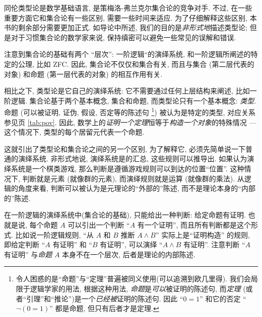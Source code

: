 \label{sec:axioms}

同伦类型论是数学基础语言, 是策梅洛-弗兰克尔集合论的竞争对手.
不过, 在一些重要方面它和集合论有一些区别, 需要一些时间来适应.
为了仔细解释这些区别, 本书的剩余部分需要更加正式.
如导论中所述, 我们的目的是\emph{非形式地}描述类型论;
但是对于习惯集合论的数学家来说, 保持缜密可以避免一些常见的误解和错误.

注意到集合论的基础有两个 ``层次'': 一阶逻辑``的演绎系统, 和一阶逻辑所阐述的特定的公理, 比如 ZFC. 因此, 集合论不仅仅和集合有关, 而且与集合 (第二层代表的对象) 和命题 (第一层代表的对象) 的相互作用有关.

相比之下, 类型论是它自己的演绎系统: 它不需要通过任何上层结构来阐述, 比如一阶逻辑.
集合论基于两个基本概念, 集合和命题, 而类型论只有一个基本概念: \emph{类型}.
命题 (可以被证明, 证伪, 假设, 否定等的陈述句%
\footnote{令人困惑的是``命题''与``定理''普遍被同义使用(可以追溯到欧几里得).
我们会局限于逻辑学家的用法, 根据这种用法, \emph{命题}是\emph{可以}被证明的陈述句, 而\emph{定理} (或者``引理''和``推论'')是一个\emph{已经被}证明的陈述句.
因此 ``$0=1$'' 和它的否定 ``$\neg(0=1)$'' 都是命题, 但只有后者才是定理.}) 被认为是特定的类型, 对应关系参见\pageref{tab:pov}页 \cref{tab:pov}. 因此, 数学上的\emph{证明一个定理}恒等于\emph{构造一个对象}的特殊情况 --- 这个情况下, 类型的每个居留元代表一个命题.

%
这就引出了类型论和集合论之间的另一个区别, 为了解释它, 必须先简单说一下普通的演绎系统. 非形式地说, 演绎系统是的汇总,%
这些规则可以推导出. %
如果认为演绎系统是一个棋类游戏, %
那么判断是遵循游戏规则可以到达的位置``位置''.
这种情况下, 判断就是元素 (就像群的元素), 而演绎规则就是运算 (就像群的乘法).
从逻辑的角度来看, 判断可以被认为是元理论的``外部的''陈述, 而不是理论本身的``内部的''陈述.

在一阶逻辑的演绎系统中(集合论的基础), 只能给出一种判断: 给定命题有证明.
也就是说, 每个命题 $A$ 可以引出一个判断 ``$A$ 有一个证明'', 而且所有判断都是这个形式.
比如说一阶逻辑规则, ``从 $A$ 和 $B$ 推断 $A\wedge B$'' 实际上是``证明构造'' 的规则, 即给定判断 ``$A$ 有证明'' 和 ``$B$ 有证明'', 可以演绎 ``$A\wedge B$ 有证明''.
注意判断 ``$A$ 有证明'' 与\emph{命题} $A$ 本身不在一个层次, 后者是理论的内部陈述.

